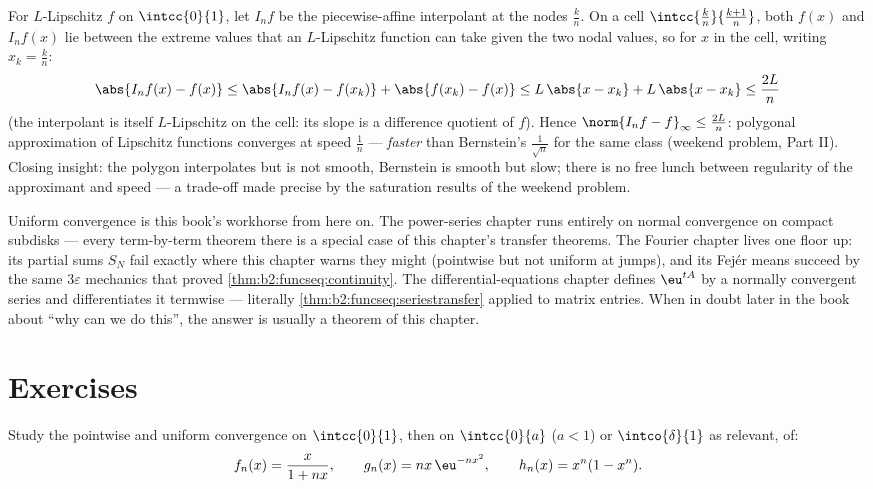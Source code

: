 \begin{example}\label{ex:b2:funcseq:polygonal}
For $L$-Lipschitz $f$ on $\intcc{0}{1}$, let $I_nf$ be the
piecewise-affine interpolant at the nodes $\frac kn$. On a
cell $\intcc{\frac kn}{\frac{k+1}n}$, both $f(x)$ and
$I_nf(x)$ lie between the extreme values that an $L$-Lipschitz
function can take given the two nodal values, so for $x$ in
the cell, writing $x_k = \frac kn$:
\[
\abs{I_nf(x) - f(x)}
\leq \abs{I_nf(x) - f(x_k)} + \abs{f(x_k) - f(x)}
\leq L\,\abs{x - x_k} + L\,\abs{x - x_k}
\leq \frac{2L}{n}
\]
(the interpolant is itself $L$-Lipschitz on the cell: its
slope is a difference quotient of $f$). Hence $\norm{I_nf -
f}_\infty \leq \frac{2L}{n}$: polygonal approximation of
Lipschitz functions converges at speed $\frac1n$ ---
\emph{faster} than Bernstein's $\frac{1}{\sqrt n}$ for the
same class (weekend problem, Part II). Closing insight: the
polygon interpolates but is not smooth, Bernstein is smooth
but slow; there is no free lunch between regularity of the
approximant and speed --- a trade-off made precise by the
saturation results of the weekend problem.
\end{example}

\begin{remark}
Uniform convergence is this book's workhorse from here on. The
power-series chapter runs entirely on normal convergence on
compact subdisks --- every term-by-term theorem there is a
special case of this chapter's transfer theorems. The Fourier
chapter lives one floor up: its partial sums $S_N$ fail
exactly where this chapter warns they might (pointwise but not
uniform at jumps), and its Fej\'er means succeed by the same
$3\varepsilon$ mechanics that proved
\cref{thm:b2:funcseq:continuity}. The differential-equations
chapter defines $\eu^{tA}$ by a normally convergent series and
differentiates it termwise --- literally
\cref{thm:b2:funcseq:seriestransfer} applied to matrix
entries. When in doubt later in the book about ``why can we
do this'', the answer is usually a theorem of this chapter.
\end{remark}

\section{Exercises}

\begin{exercise}[$\star$]\label{exo:b2:funcseq:1}
Study the pointwise and uniform convergence on $\intcc{0}{1}$, then
on $\intcc{0}{a}$ ($a < 1$) or $\intco{\delta}{1}$ as relevant, of:
\[
f_n(x) = \frac{x}{1 + nx},
\qquad
g_n(x) = n x\,\eu^{-n x^2},
\qquad
h_n(x) = x^n(1 - x^n).
\]
\end{exercise}

